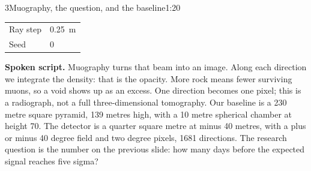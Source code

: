 \documentclass[11pt,a4paper]{article}
\newcommand{\spoken}{\par\smallskip\noindent\textbf{Spoken script.}\;}
\begin{document}
\begin{slidebox}{3}{Muography, the question, and the baseline}{1:20}
\begin{center}
\begin{minipage}{0.39\linewidth}
\begin{tabular}{@{}ll@{}}
Ray step & 0.25~m \\
Seed & 0 \\
\bottomrule
\end{tabular}
\end{minipage}
\end{center}
\spoken
Muography turns that beam into an image. Along each direction we integrate the
density: that is the opacity. More rock means fewer surviving muons, so a void
shows up as an excess. One direction becomes one pixel; this is a radiograph,
not a full three-dimensional tomography. Our baseline is a 230 metre square
pyramid, 139 metres high, with a 10 metre spherical chamber at height 70. The
detector is a quarter square metre at minus 40 metres, with a plus or minus 40
degree field and two degree pixels, 1681 directions. The research question is
the number on the previous slide: how many days before the expected signal
reaches five sigma?
\end{slidebox}
\end{document}
